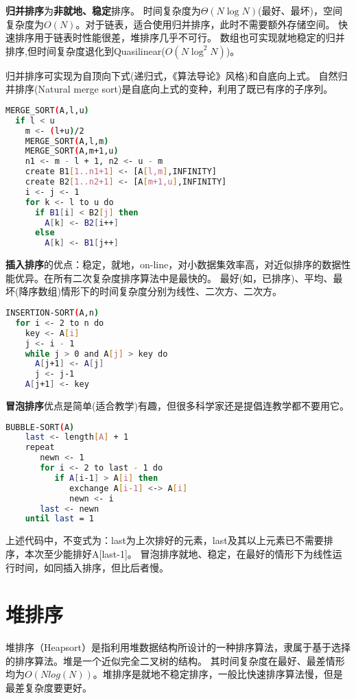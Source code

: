 \textbf{归并排序}为\textbf{非就地、稳定}排序。
时间复杂度为$\Theta(N \log N)$(最好、最坏)，空间复杂度为$O(N)$。对于链表，适合使用归并排序，此时不需要额外存储空间。
快速排序用于链表时性能很差，堆排序几乎不可行。
数组也可实现就地稳定的归并排序,但时间复杂度退化到Quasilinear($O(N \log^2 N)$)。

归并排序可实现为自顶向下式(递归式，《算法导论》风格)和自底向上式。
自然归并排序(Natural merge sort)是自底向上式的变种，利用了既已有序的子序列。



\begin{lstlisting}[language=bash]
MERGE_SORT(A,l,u)
  if l < u
    m <- (l+u)/2
    MERGE_SORT(A,l,m)
    MERGE_SORT(A,m+1,u)
    n1 <- m - l + 1, n2 <- u - m
    create B1[1..n1+1] <- [A[l,m],INFINITY]
    create B2[1..n2+1] <- [A[m+1,u],INFINITY]
    i <- j <- 1
    for k <- l to u do
      if B1[i] < B2[j] then
        A[k] <- B2[i++]
      else
        A[k] <- B1[j++]   
\end{lstlisting}

\textbf{插入排序}的优点：稳定，就地，on-line，对小数据集效率高，对近似排序的数据性能优异。在所有二次复杂度排序算法中是最快的。
最好(如，已排序)、平均、最坏(降序数组)情形下的时间复杂度分别为线性、二次方、二次方。
\begin{lstlisting}[language=bash]
INSERTION-SORT(A,n)
  for i <- 2 to n do
    key <- A[i]
    j <- i - 1
    while j > 0 and A[j] > key do
      A[j+1] <- A[j]
      j <- j-1
    A[j+1] <- key
\end{lstlisting}

\textbf{冒泡排序}优点是简单(适合教学)有趣，但很多科学家还是提倡连教学都不要用它。

\begin{lstlisting}[language=bash]
BUBBLE-SORT(A)
    last <- length[A] + 1
    repeat
       newn <- 1
       for i <- 2 to last - 1 do
          if A[i-1] > A[i] then
             exchange A[i-1] <-> A[i]
             newn <- i
       last <- newn
    until last = 1
\end{lstlisting}
上述代码中，不变式为：last为上次排好的元素，last及其以上元素已不需要排序，本次至少能排好A[last-1]。
冒泡排序就地、稳定，在最好的情形下为线性运行时间，如同插入排序，但比后者慢。




\section{堆排序}
堆排序（Heapsort）是指利用堆数据结构所设计的一种排序算法，隶属于基于选择的排序算法。堆是一个近似完全二叉树的结构。
其时间复杂度在最好、最差情形均为$O(Nlog(N))$。堆排序是就地不稳定排序，一般比快速排序算法慢，但是最差复杂度要更好。



